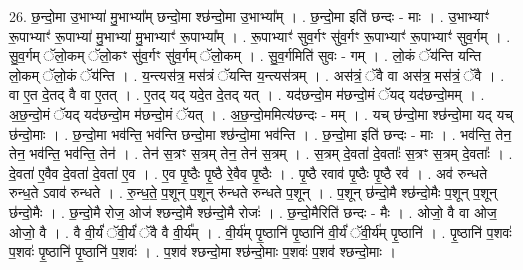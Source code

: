\documentclass[17pt]{extarticle}
\begin{document}
26. छ॒न्दो॒मा उ॒भाभ्या॑ मु॒भाभ्या᳚म् छन्दो॒मा श्छ॑न्दो॒मा उ॒भाभ्या᳚म् । . छ॒न्दो॒मा इति॑ छन्दः - माः । . उ॒भाभ्याꣳ॑ रू॒पाभ्याꣳ॑ रू॒पाभ्या॑ मु॒भाभ्या॑ मु॒भाभ्याꣳ॑ रू॒पाभ्या᳚म् । . रू॒पाभ्याꣳ॑ सुव॒र्गꣳ सु॑व॒र्गꣳ रू॒पाभ्याꣳ॑ रू॒पाभ्याꣳ॑ सुव॒र्गम् । . सु॒व॒र्गम् ॅलो॒कम् ॅलो॒कꣳ सु॑व॒र्गꣳ सु॑व॒र्गम् ॅलो॒कम् । . सु॒व॒र्गमिति॑ सुवः - गम् । . लो॒कं ॅय॑न्ति यन्ति लो॒कम् ॅलो॒कं ॅय॑न्ति । . य॒न्त्यस॑त्र॒ मस॑त्रं ॅयन्ति य॒न्त्यस॑त्रम् । . अस॑त्रं॒ ॅवै वा अस॑त्र॒ मस॑त्रं॒ ॅवै । . वा ए॒त दे॒तद् वै वा ए॒तत् । . ए॒तद् यद् यदे॒त दे॒तद् यत् । . यद॑छन्दो॒म म॑छन्दो॒मं ॅयद् यद॑छन्दो॒मम् । . अ॒छ॒न्दो॒मं ॅयद् यद॑छन्दो॒म म॑छन्दो॒मं ॅयत् । . अ॒छ॒न्दो॒ममित्य॑छन्दः - मम् । . यच् छ॑न्दो॒मा श्छ॑न्दो॒मा यद् यच् छ॑न्दो॒माः । . छ॒न्दो॒मा भव॑न्ति॒ भव॑न्ति छन्दो॒मा श्छ॑न्दो॒मा भव॑न्ति । . छ॒न्दो॒मा इति॑ छन्दः - माः । . भव॑न्ति॒ तेन॒ तेन॒ भव॑न्ति॒ भव॑न्ति॒ तेन॑ । . तेन॑ स॒त्रꣳ स॒त्रम् तेन॒ तेन॑ स॒त्रम् । . स॒त्रम् दे॒वता॑ दे॒वताः᳚ स॒त्रꣳ स॒त्रम् दे॒वताः᳚ । . दे॒वता॑ ए॒वैव दे॒वता॑ दे॒वता॑ ए॒व । . ए॒व पृ॒ष्ठैः पृ॒ष्ठै रे॒वैव पृ॒ष्ठैः । . पृ॒ष्ठै रवाव॑ पृ॒ष्ठैः पृ॒ष्ठै रव॑ । . अव॑ रुन्धते रुन्ध॒ते ऽवाव॑ रुन्धते । . रु॒न्ध॒ते॒ प॒शून् प॒शून् रु॑न्धते रुन्धते प॒शून् । . प॒शून् छ॑न्दो॒मै श्छ॑न्दो॒मैः प॒शून् प॒शून् छ॑न्दो॒मैः । . छ॒न्दो॒मै रोज॒ ओज॑ श्छन्दो॒मै श्छ॑न्दो॒मै रोजः॑ । . छ॒न्दो॒मैरिति॑ छन्दः - मैः । . ओजो॒ वै वा ओज॒ ओजो॒ वै । . वै वी॒र्यं॑ ॅवी॒र्यं॑ ॅवै वै वी॒र्य᳚म् । . वी॒र्य॑म् पृ॒ष्ठानि॑ पृ॒ष्ठानि॑ वी॒र्यं॑ ॅवी॒र्य॑म् पृ॒ष्ठानि॑ । . पृ॒ष्ठानि॑ प॒शवः॑ प॒शवः॑ पृ॒ष्ठानि॑ पृ॒ष्ठानि॑ प॒शवः॑ । . प॒शव॑ श्छन्दो॒मा श्छ॑न्दो॒माः प॒शवः॑ प॒शव॑ श्छन्दो॒माः । \newline
\end{document}
